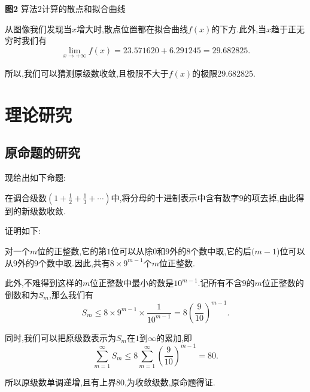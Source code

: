 \documentclass[a4paper,12pt]{article}
\begin{document}
\begin{CJK*}{UTF8}{gbsn}
\begin{center}
\textbf{图2} 算法2计算的散点和拟合曲线\\
\end{center}\par
\vspace{8pt}
从图像我们发现当$x$增大时,散点位置都在拟合曲线$f(x)$的下方.此外,当$x$趋于正无穷时我们有
\begin{equation*}
\lim_{ x \to {+\infty}}f(x)=23.571620+6.291245=29.682825.
\end{equation*}\par
所以,我们可以猜测原级数收敛,且极限不大于$f(x)$的极限29.682825.
\section{理论研究}
\subsection{原命题的研究}
\noindent 现给出如下命题:\par\vspace{5pt}
在调合级数$\displaystyle(1+\frac{1}{2}+\frac{1}{3}+\cdots)$中,将分母的十进制表示中含有数字$9$的项去掉,由此得到的新级数收敛.\par\vspace{10pt}
\noindent 证明如下:\par\vspace{5pt}
对一个$m$位的正整数,它的第$1$位可以从除$0$和$9$外的$8$个数中取,它的后$(m-1$)位可以从$9$外的$9$个数中取.因此,共有$8\times9^{m-1}$个$m$位正整数.\par\vspace{5pt}
此外,不难得到这样的$m$位正整数中最小的数是$10^{m-1}$.记所有不含$9$的$m$位正整数的倒数和为$S_m$,那么我们有
\begin{equation*}
S_m\leqslant8\times9^{m-1}\times\frac{1}{10^{m-1}}=8(\frac{9}{10})^{m-1}.
\end{equation*}\par
同时,我们可以把原级数表示为$S_m$在$1$到$\infty$的累加,即
\begin{equation*}
\sum_{m=1}^{\infty}S_m\leqslant8\sum_{m=1}^{\infty}(\frac{9}{10})^{m-1}=80.
\end{equation*}\par
所以原级数单调递增,且有上界$80$,为收敛级数,原命题得证.


\end{CJK*}
\end{document}
